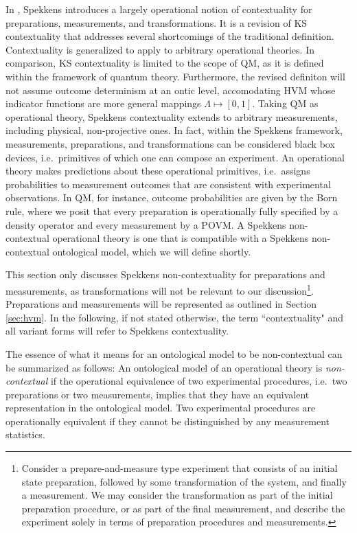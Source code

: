 In \cite{Spekkens2005}, Spekkens introduces a largely operational notion of contextuality for preparations, measurements, and transformations. It is a revision of KS contextuality that addresses several shortcomings of the traditional definition. Contextuality is generalized to apply to arbitrary operational theories. In comparison, KS contextuality is limited to the scope of QM, as it is defined within the framework of quantum theory. Furthermore, the revised definiton will not assume outcome determinism at an ontic level, accomodating HVM whose indicator functions are more general mappings $\Lambda\mapsto [0,1]$. Taking QM as operational theory, Spekkens contextuality extends to arbitrary measurements, including physical, non-projective ones. In fact, within the Spekkens framework, measurements, preparations, and transformations can be considered black box devices, i.e.\ primitives of which one can compose an experiment. An operational theory makes predictions about these operational primitives, i.e.\ assigns probabilities to measurement outcomes that are consistent with experimental observations. In QM, for instance, outcome probabilities are given by the Born rule, where we posit that every preparation is operationally fully specified by a density operator and every measurement by a POVM. A Spekkens non-contextual operational theory is one that is compatible with a Spekkens non-contextual ontological model, which we will define shortly. 

This section only discusses Spekkens non-contextuality for preparations and measurements, as transformations will not be relevant to our discussion\footnote{Consider a prepare-and-measure type experiment that consists of an initial state preparation, followed by some transformation of the system, and finally a measurement. We may consider the transformation as part of the initial preparation procedure, or as part of the final measurement, and describe the experiment solely in terms of preparation procedures and measurements.}. Preparations and measurements will be represented as outlined in Section \ref{sec:hvm}. In the following, if not stated otherwise, the term ``contextuality" and all variant forms will refer to Spekkens contextuality.

The essence of what it means for an ontological model to be non-contextual can be summarized as follows:
An ontological model of an operational theory is \emph{non-contextual} if the operational equivalence of two experimental procedures, i.e.\ two preparations or two measurements, 
implies that they have an equivalent representation in the ontological model.
Two experimental procedures are operationally equivalent if they cannot be distinguished by any measurement statistics. 

